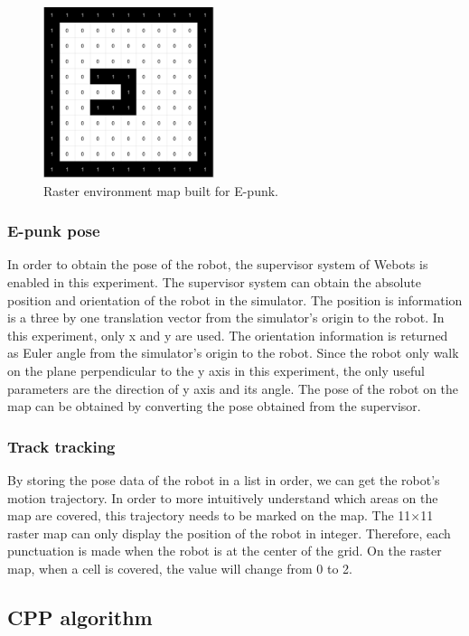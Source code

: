 \documentclass[conference]{IEEEtran}
\begin{document}
\begin{figure}[htbp]
\setlength{\belowcaptionskip}{-1cm}
\centerline{\includegraphics[width=5cm,height=5cm]{map.png}}
\caption{Raster environment map built for E-punk.}
\label{fig2}
\end{figure}

\subsubsection{E-punk pose}

In order to obtain the pose of the robot, the supervisor system of Webots is enabled in this experiment. The supervisor system can obtain the absolute position and orientation of the robot in the simulator. The position is information is a three by one translation vector from the simulator's origin to the robot. In this experiment, only x and y are used. The orientation information is returned as Euler angle from the simulator's origin to the robot. Since the robot only walk on the plane perpendicular to the y axis in this experiment, the only useful parameters are the direction of y axis and its angle. The pose of the robot on the map can be obtained by converting the pose obtained from the supervisor. 

\subsubsection{Track tracking}

By storing the pose data of the robot in a list in order, we can get the robot's motion trajectory. In order to more intuitively understand which areas on the map are covered, this trajectory needs to be marked on the map. The 11×11 raster map can only display the position of the robot in integer. Therefore, each punctuation is made when the robot is at the center of the grid. On the raster map, when a cell is covered, the value will change from 0 to 2.

\subsection{CPP algorithm}
\end{document}
